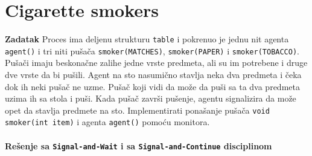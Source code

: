 \clearpage
\section{\latin Cigarette smokers}
\textbf{\large Zadatak} Proces ima deljenu strukturu \texttt{table} i pokrenuo je jednu nit agenta \texttt{agent()} i tri niti pu\v{s}a\v{c}a \texttt{smoker(MATCHES)}, \texttt{smoker(PAPER)} i \texttt{smoker(TOBACCO)}. Pu\v{s}a\v{c}i imaju beskona\v{c}ne zalihe jedne vrste predmeta, ali su im potrebene i druge dve vrste da bi pu\v{s}ili. Agent na sto nasumi\v{c}no stavlja neka dva  predmeta i \v{c}eka dok ih neki pu\v{s}a\v{c} ne uzme. Pu\v{s}a\v{c} koji vidi da mo\v{z}e da pu\v{s}i sa ta dva predmeta uzima ih sa stola i pu\v{s}i. Kada pu\v{s}a\v{c} zavr\v{s}i pu\v{s}enje, agentu signalizira da mo\v{z}e opet da stavlja predmete na sto. Implementirati pona\v{s}anje pu\v{s}a\v{c}a \texttt{void smoker(int item)} i agenta \texttt{agent()} pomo\'{c}u monitora.
\\\\
\textbf{Re\v{s}enje sa \texttt{Signal-and-Wait} i sa \texttt{Signal-and-Continue} disciplinom}
